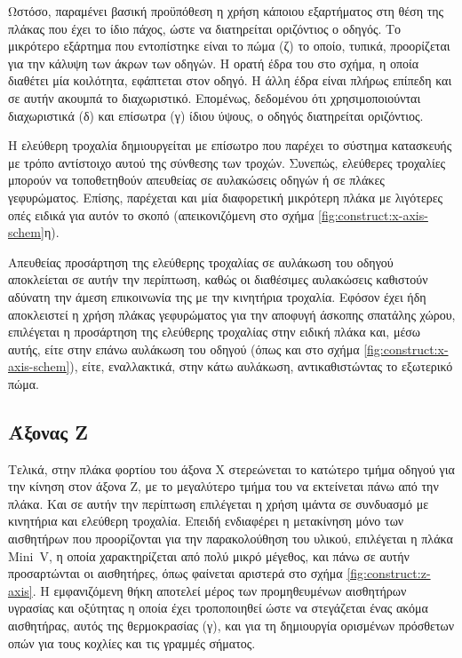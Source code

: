 Ωστόσο, παραμένει βασική προϋπόθεση η χρήση κάποιου εξαρτήματος στη θέση της
πλάκας που έχει το ίδιο πάχος, ώστε να διατηρείται οριζόντιος ο οδηγός. Το
μικρότερο εξάρτημα που εντοπίστηκε είναι το πώμα (ζ) το οποίο, τυπικά,
προορίζεται για την κάλυψη των άκρων των οδηγών. Η ορατή έδρα του στο σχήμα, η
οποία διαθέτει μία κοιλότητα, εφάπτεται στον οδηγό. Η άλλη έδρα είναι πλήρως
επίπεδη και σε αυτήν ακουμπά το διαχωριστικό. Επομένως, δεδομένου ότι
χρησιμοποιούνται διαχωριστικά (δ) και επίσωτρα (γ) ίδιου ύψους, ο οδηγός
διατηρείται οριζόντιος.

Η ελεύθερη τροχαλία δημιουργείται με επίσωτρο που παρέχει το σύστημα κατασκευής
με τρόπο αντίστοιχο αυτού της σύνθεσης των τροχών. Συνεπώς, ελεύθερες τροχαλίες
μπορούν να τοποθετηθούν απευθείας σε αυλακώσεις οδηγών ή σε πλάκες γεφυρώματος.
Επίσης, παρέχεται και μία διαφορετική μικρότερη πλάκα με λιγότερες οπές ειδικά
για αυτόν το σκοπό (απεικονιζόμενη στο σχήμα \ref{fig:construct:x-axis-schem}η).

Απευθείας προσάρτηση της ελεύθερης τροχαλίας σε αυλάκωση του οδηγού αποκλείεται
σε αυτήν την περίπτωση, καθώς οι διαθέσιμες αυλακώσεις καθιστούν αδύνατη την
άμεση επικοινωνία της με την κινητήρια τροχαλία. Εφόσον έχει ήδη αποκλειστεί η
χρήση πλάκας γεφυρώματος για την αποφυγή άσκοπης σπατάλης χώρου, επιλέγεται η
προσάρτηση της ελεύθερης τροχαλίας στην ειδική πλάκα και, μέσω αυτής, είτε στην
επάνω αυλάκωση του οδηγού (όπως και στο σχήμα \ref{fig:construct:x-axis-schem}),
είτε, εναλλακτικά, στην κάτω αυλάκωση, αντικαθιστώντας το εξωτερικό πώμα.


\subsection{Άξονας Z}
\label{subsec:construct:z}

\label{sec:construct:z-axis}
Τελικά, στην πλάκα φορτίου του άξονα X στερεώνεται το κατώτερο τμήμα οδηγού για
την κίνηση στον άξονα Z, με το μεγαλύτερο τμήμα του να εκτείνεται πάνω από την
πλάκα. Και σε αυτήν την περίπτωση επιλέγεται η χρήση ιμάντα σε συνδυασμό με
κινητήρια και ελεύθερη τροχαλία. Επειδή ενδιαφέρει η μετακίνηση μόνο των
αισθητήρων που προορίζονται για την παρακολούθηση του υλικού, επιλέγεται η πλάκα
Mini~V, η οποία χαρακτηρίζεται από πολύ μικρό μέγεθος, και πάνω σε αυτήν
προσαρτώνται οι αισθητήρες, όπως φαίνεται αριστερά στο σχήμα
\ref{fig:construct:z-axis}. Η εμφανιζόμενη θήκη αποτελεί μέρος των προμηθευμένων
αισθητήρων υγρασίας και οξύτητας η οποία έχει τροποποιηθεί ώστε να στεγάζεται
ένας ακόμα αισθητήρας, αυτός της θερμοκρασίας (γ), και για τη δημιουργία
ορισμένων πρόσθετων οπών για τους κοχλίες και τις γραμμές σήματος.

